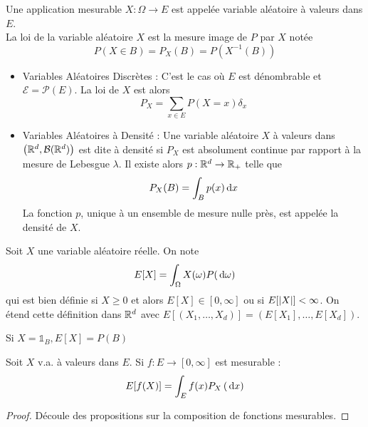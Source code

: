 \documentclass{cours}
\begin{document}
    \begin{definition}
        Une application mesurable $X : \Omega \rightarrow E$ est appelée variable aléatoire à valeurs dans $E$. \\
        La loi de la variable aléatoire $X$ est la mesure image de $P$ par $X$ notée
        \[
            P(X\in B) = P_{X}(B)= P\left(X^{-1}(B)\right)
        \]
    \end{definition}

    \begin{definition}
        \begin{itemize}
            \item Variables Aléatoires Discrètes : C'est le cas où $E$ est dénombrable et $\mathcal{E} = \mathcal{P}(E)$. La loi de $X$ est alors \[P_{X} = \sum_{x \in E}P(X = x)\delta_{x}\]
            \item Variables Aléatoires à Densité : Une variable aléatoire $X$ à valeurs dans $\left(\mathbb{R}^{d}, \mathcal{B}(\mathbb{R}^{d})\right)$ est dite à densité si $P_{X}$ est absolument continue par rapport à la mesure de Lebesgue $\lambda$. Il existe alors $p : \mathbb{R}^{d} \rightarrow \mathbb{R}_{+}$ telle que \[P_{X}(B) = \int_{B}p(x){\rm \, d} x\] La fonction $p$, unique à un ensemble de mesure nulle près, est appelée la densité de $X$.
        \end{itemize}
    \end{definition}

    \begin{definition}
        Soit $X$ une variable aléatoire réelle. On note \[E[X] = \int_{\Omega}X(\omega)P({\rm \, d} \omega)\]
        qui est bien définie si $X \geq 0$ et alors $E[X] \in \left[0, \infty\right]$ ou si $E[\left|X\right|] < \infty$. On étend cette définition dans $\mathbb{R}^{d}$ avec $E\left[\left(X_{1}, \ldots, X_{d}\right)\right] = \left(E[X_{1}], \ldots, E[X_{d}]\right)$.
    \end{definition}

    \begin{proposition}
        Si $X = \mathds{1}_{B}, E[X] = P(B)$ 
    \end{proposition}

    \begin{proposition}
        Soit $X$ v.a. à valeurs dans $E$. Si $f : E \rightarrow \left[0, \infty\right]$ est mesurable : 
        \[
            E[f(X)] = \int_{E} f(x)P_{X}\left({\rm \, d} x\right)
        \]
    \end{proposition}
    \begin{proof}
        Découle des propositions sur la composition de fonctions mesurables.
    \end{proof}
\end{document}
